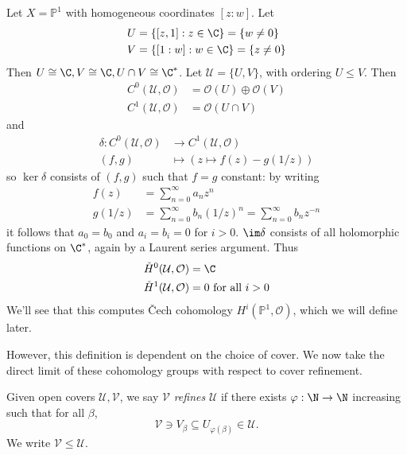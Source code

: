 \documentclass[a4paper]{article}
\renewcommand{\P}{\mathbb P} %
\begin{document}
\begin{eg}
  Let \(X = \P^1\) with homogeneous coordinates \([z : w]\). Let
  \begin{align*}
    U &= \{[z, 1]: z \in \C\} = \{w \neq 0\} \\
    V &= \{[1: w]: w \in \C\} = \{z \neq 0\}
  \end{align*}
  Then \(U \cong \C, V \cong \C, U \cap V \cong \C^*\). Let \(\mathcal U = \{U, V\}\), with ordering \(U \leq V\). Then
  \begin{align*}
    C^0(\mathcal U, \mathcal O) &= \mathcal O(U) \oplus \mathcal O(V) \\
    C^1(\mathcal U, \mathcal O) &= \mathcal O(U \cap V)
  \end{align*}
  and
  \begin{align*}
    \delta: C^0(\mathcal U, \mathcal O) &\to C^1(\mathcal U, \mathcal O) \\
    (f, g) &\mapsto (z \mapsto f(z) - g(1/z))
  \end{align*}
  so \(\ker \delta\) consists of \((f, g)\) such that \(f = g\) constant: by writing
  \begin{align*}
    f(z) &= \sum_{n = 0}^\infty a_n z^n \\
    g(1/z) &= \sum_{n = 0}^\infty b_n (1/z)^n = \sum_{n = 0}^\infty b_n z^{-n}
  \end{align*}
  it follows that \(a_0 = b_0\) and \(a_i = b_i = 0\) for \(i > 0\).
  \(\im \delta\) consists of all holomorphic functions on \(\C^*\), again by a Laurent series argument. Thus
  \begin{align*}
    \check H^0(\mathcal U, \mathcal O) &= \C \\
    \check H^1(\mathcal U, \mathcal O) &= 0 \text{ for all } i > 0
  \end{align*}
  We'll see that this computes Čech cohomology \(H^i(\P^1, \mathcal O)\), which we will define later.
\end{eg}

However, this definition is dependent on the choice of cover. We now take the direct limit of these cohomology groups with respect to cover refinement.

\begin{definition}
  Given open covers \(\mathcal U, \mathcal V\), we say \(\mathcal V\) \emph{refines} \(\mathcal U\) if there exists \(\varphi: \N \to \N\) increasing such that for all \(\beta\),
  \[
    \mathcal V \ni V_\beta \subseteq U_{\varphi(\beta)} \in \mathcal U.
  \]
  We write \(\mathcal V \leq \mathcal U\).
\end{definition}
\end{document}
